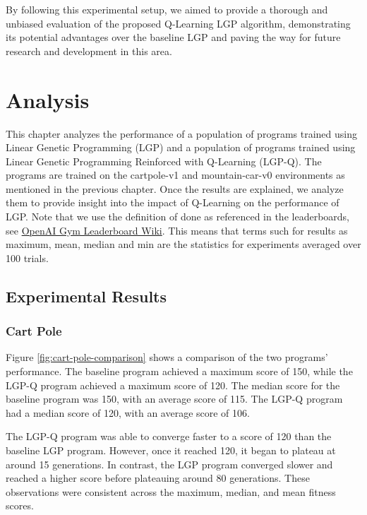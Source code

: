 \documentclass[12pt, final]{dalcsthesis}
\begin{document}
By following this experimental setup, we aimed to provide a thorough and unbiased evaluation of the proposed Q-Learning LGP algorithm, demonstrating its potential advantages over the baseline LGP and paving the way for future research and development in this area.

\chapter{Analysis}

This chapter analyzes the performance of a population of programs trained using Linear Genetic Programming (LGP)
and a population of programs trained using Linear Genetic Programming Reinforced with Q-Learning (LGP-Q). The programs
are trained on the cartpole-v1 and mountain-car-v0 environments \cite{1606.01540} as mentioned in the previous chapter.
Once the results are explained, we analyze them to provide insight into the impact of Q-Learning on the performance of LGP. Note that we use the definition of done as referenced in the leaderboards, see \href{https://github.com/openai/gym/wiki/Leaderboard}{OpenAI Gym Leaderboard Wiki}. This means that terms such for results as maximum, mean, median and min are the statistics for experiments averaged over 100 trials.

\section{Experimental Results}

\subsection{Cart Pole}

Figure \ref{fig:cart-pole-comparison} shows a comparison of the two programs' performance. The baseline program achieved a maximum score of 150, while the LGP-Q program achieved a maximum score of 120. The median score for the baseline program was 150, with an average score of 115. The LGP-Q program had a median score of 120, with an average score of 106.

The LGP-Q program was able to converge faster to a score of 120 than the baseline LGP program. However, once it reached 120, it began to plateau at around 15 generations. In contrast, the LGP program converged slower and reached a higher score before plateauing around 80 generations. These observations were consistent across the maximum, median, and mean fitness scores.
\end{document}
